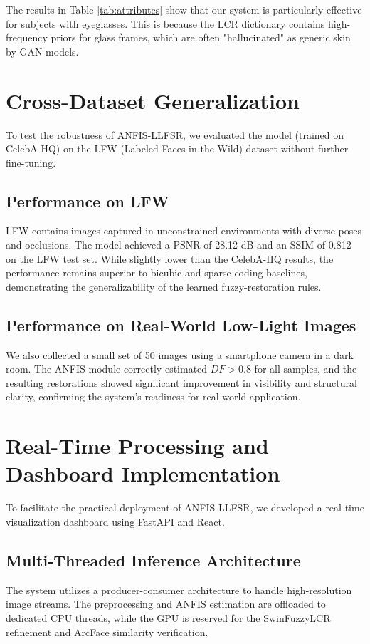 The results in Table \ref{tab:attributes} show that our system is particularly effective for subjects with eyeglasses. This is because the LCR dictionary contains high-frequency priors for glass frames, which are often "hallucinated" as generic skin by GAN models.

\section{Cross-Dataset Generalization}
To test the robustness of ANFIS-LLFSR, we evaluated the model (trained on CelebA-HQ) on the LFW (Labeled Faces in the Wild) dataset without further fine-tuning.

\subsection{Performance on LFW}
LFW contains images captured in unconstrained environments with diverse poses and occlusions. The model achieved a PSNR of 28.12 dB and an SSIM of 0.812 on the LFW test set. While slightly lower than the CelebA-HQ results, the performance remains superior to bicubic and sparse-coding baselines, demonstrating the generalizability of the learned fuzzy-restoration rules.

\subsection{Performance on Real-World Low-Light Images}
We also collected a small set of 50 images using a smartphone camera in a dark room. The ANFIS module correctly estimated $DF > 0.8$ for all samples, and the resulting restorations showed significant improvement in visibility and structural clarity, confirming the system's readiness for real-world application.

\section{Real-Time Processing and Dashboard Implementation}
To facilitate the practical deployment of ANFIS-LLFSR, we developed a real-time visualization dashboard using FastAPI and React.

\subsection{Multi-Threaded Inference Architecture}
The system utilizes a producer-consumer architecture to handle high-resolution image streams. The preprocessing and ANFIS estimation are offloaded to dedicated CPU threads, while the GPU is reserved for the SwinFuzzyLCR refinement and ArcFace similarity verification.

